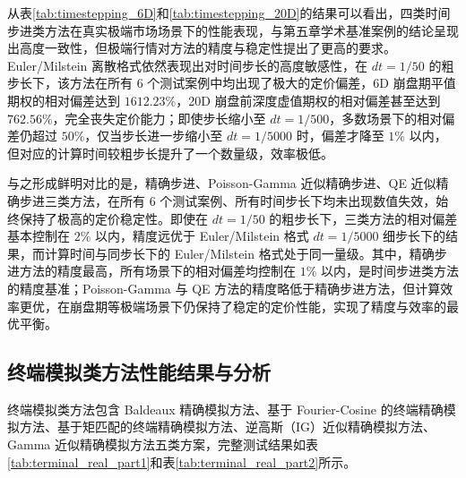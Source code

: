 从表\ref{tab:timestepping_6D}和\ref{tab:timestepping_20D}的结果可以看出，四类时间步进类方法在真实极端市场场景下的性能表现，与第五章学术基准案例的结论呈现出高度一致性，但极端行情对方法的精度与稳定性提出了更高的要求。Euler/Milstein 离散格式依然表现出对时间步长的高度敏感性，在 $dt=1/50$ 的粗步长下，该方法在所有 6 个测试案例中均出现了极大的定价偏差，6D 崩盘期平值期权的相对偏差达到 $1612.23\%$，20D 崩盘前深度虚值期权的相对偏差甚至达到 $762.56\%$，完全丧失定价能力；即使步长缩小至 $dt=1/500$，多数场景下的相对偏差仍超过 $50\%$，仅当步长进一步缩小至 $dt=1/5000$ 时，偏差才降至 $1\%$ 以内，但对应的计算时间较粗步长提升了一个数量级，效率极低。

与之形成鲜明对比的是，精确步进、Poisson-Gamma 近似精确步进、QE 近似精确步进三类方法，在所有 6 个测试案例、所有时间步长下均未出现数值失效，始终保持了极高的定价稳定性。即使在 $dt=1/50$ 的粗步长下，三类方法的相对偏差基本控制在 $2\%$ 以内，精度远优于 Euler/Milstein 格式 $dt=1/5000$ 细步长下的结果，而计算时间与同步长下的 Euler/Milstein 格式处于同一量级。其中，精确步进方法的精度最高，所有场景下的相对偏差均控制在 $1\%$ 以内，是时间步进类方法的精度基准；Poisson-Gamma 与 QE 方法的精度略低于精确步进方法，但计算效率更优，在崩盘期等极端场景下仍保持了稳定的定价性能，实现了精度与效率的最优平衡。

\subsection{终端模拟类方法性能结果与分析}

终端模拟类方法包含 Baldeaux 精确模拟方法、基于 Fourier-Cosine 的终端精确模拟方法、基于矩匹配的终端精确模拟方法、逆高斯（IG）近似精确模拟方法、Gamma 近似精确模拟方法五类方案，完整测试结果如表\ref{tab:terminal_real_part1}和表\ref{tab:terminal_real_part2}所示。

